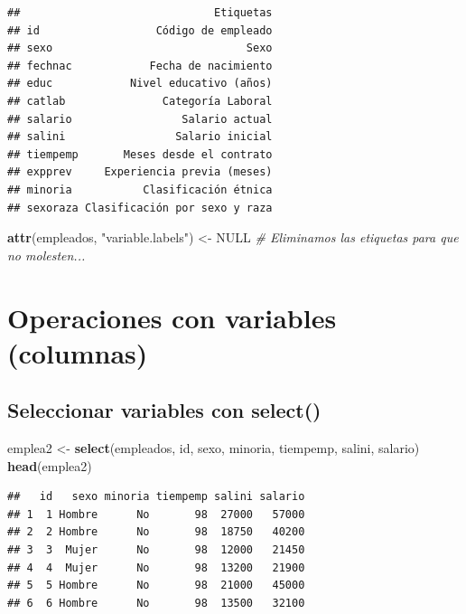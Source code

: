 \documentclass[]{book}
\newenvironment{Shaded}{\begin{snugshade}}{\end{snugshade}}
\newcommand{\KeywordTok}[1]{\textcolor[rgb]{0.13,0.29,0.53}{\textbf{#1}}}
\newcommand{\StringTok}[1]{\textcolor[rgb]{0.31,0.60,0.02}{#1}}
\newcommand{\CommentTok}[1]{\textcolor[rgb]{0.56,0.35,0.01}{\textit{#1}}}
\newcommand{\OtherTok}[1]{\textcolor[rgb]{0.56,0.35,0.01}{#1}}
\newcommand{\NormalTok}[1]{#1}
\begin{document}
\begin{verbatim}
##                              Etiquetas
## id                  Código de empleado
## sexo                              Sexo
## fechnac            Fecha de nacimiento
## educ            Nivel educativo (años)
## catlab               Categoría Laboral
## salario                 Salario actual
## salini                 Salario inicial
## tiempemp       Meses desde el contrato
## expprev     Experiencia previa (meses)
## minoria           Clasificación étnica
## sexoraza Clasificación por sexo y raza
\end{verbatim}

\begin{Shaded}
\begin{Highlighting}[]
\KeywordTok{attr}\NormalTok{(empleados, }\StringTok{"variable.labels"}\NormalTok{) <-}\StringTok{ }\OtherTok{NULL}                  \CommentTok{# Eliminamos las etiquetas para que no molesten...}
\end{Highlighting}
\end{Shaded}

\section{Operaciones con variables
(columnas)}\label{operaciones-con-variables-columnas}

\subsection{\texorpdfstring{Seleccionar variables con
\textbf{select()}}{Seleccionar variables con select()}}\label{seleccionar-variables-con-select}

\begin{Shaded}
\begin{Highlighting}[]
\NormalTok{emplea2 <-}\StringTok{ }\KeywordTok{select}\NormalTok{(empleados, id, sexo, minoria, tiempemp, salini, salario)}
\KeywordTok{head}\NormalTok{(emplea2)}
\end{Highlighting}
\end{Shaded}

\begin{verbatim}
##   id   sexo minoria tiempemp salini salario
## 1  1 Hombre      No       98  27000   57000
## 2  2 Hombre      No       98  18750   40200
## 3  3  Mujer      No       98  12000   21450
## 4  4  Mujer      No       98  13200   21900
## 5  5 Hombre      No       98  21000   45000
## 6  6 Hombre      No       98  13500   32100
\end{verbatim}
\end{document}
